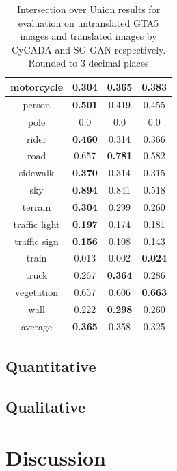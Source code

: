 \begin{table}
\begin{tabular}{|c|c|c|c|}
		\hline 
		motorcycle & 0.304 & 0.365 & \textbf{0.383} \\ 
		\hline 
		person & \textbf{0.501} & 0.419 & 0.455 \\ 
		\hline 
		pole & 0.0 & 0.0 & 0.0 \\ 
		\hline 
		rider & \textbf{0.460} & 0.314 & 0.366 \\ 
		\hline 
		road & 0.657 & \textbf{0.781} & 0.582 \\ 
		\hline 
		sidewalk & \textbf{0.370} & 0.314 & 0.315 \\ 
		\hline 
		sky & \textbf{0.894} & 0.841 & 0.518 \\ 
		\hline 
		terrain & \textbf{0.304} & 0.299 & 0.260 \\ 
		\hline 
		traffic light & \textbf{0.197} & 0.174 & 0.181 \\ 
		\hline 
		traffic sign & \textbf{0.156} & 0.108 & 0.143 \\ 
		\hline 
		train & 0.013 & 0.002 & \textbf{0.024} \\ 
		\hline 
		truck & 0.267 & \textbf{0.364} & 0.286 \\ 
		\hline 
		vegetation & 0.657 & 0.606 & \textbf{0.663} \\ 
		\hline 
		wall & 0.222 & \textbf{0.298} & 0.260 \\ 
		\hline \hline 
		average & \textbf{0.365} & 0.358 & 0.325\\
		\hline
	\end{tabular} 
	\caption{Intersection over Union results for evaluation on untranslated GTA5 images and translated images by CyCADA and SG-GAN respectively. Rounded to 3 decimal places}
	\label{table:results}
\end{table}

\subsection{Quantitative}

\subsection{Qualitative}

\section{Discussion}

